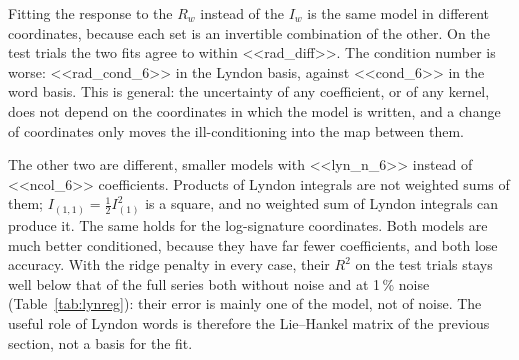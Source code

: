 \documentclass[11pt,a4paper]{article}
\theoremstyle{remark}
\begin{document}
Fitting the response to the $R_w$ instead of the $I_w$ is the same model in different coordinates, because each set is an invertible combination of the other.
On the test trials the two fits agree to within <<rad_diff>>.
The condition number is worse: <<rad_cond_6>> in the Lyndon basis, against <<cond_6>> in the word basis.
This is general: the uncertainty of any coefficient, or of any kernel, does not depend on the coordinates in which the model is written, and a change of coordinates only moves the ill-conditioning into the map between them.

The other two are different, smaller models with <<lyn_n_6>> instead of <<ncol_6>> coefficients.
Products of Lyndon integrals are not weighted sums of them; $I_{(1,1)}=\tfrac12I_{(1)}^2$ is a square, and no weighted sum of Lyndon integrals can produce it.
The same holds for the log-signature coordinates.
Both models are much better conditioned, because they have far fewer coefficients, and both lose accuracy.
With the ridge penalty in every case, their $R^2$ on the test trials stays well below that of the full series both without noise and at 1\,\% noise (Table~\ref{tab:lynreg}): their error is mainly one of the model, not of noise.
The useful role of Lyndon words is therefore the Lie--Hankel matrix of the previous section, not a basis for the fit.
\end{document}

